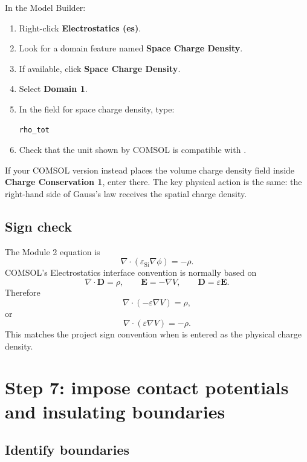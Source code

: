 \documentclass[11pt]{article}
\newcommand{\Evec}{\mathbf{E}}
\newcommand{\Dvec}{\mathbf{D}}
\newcommand{\epss}{\varepsilon_{\mathrm{Si}}}
\newcommand{\code}[1]{\texttt{\detokenize{#1}}}
\begin{document}
In the Model Builder:
\begin{enumerate}[leftmargin=2em]
\item Right-click \textbf{Electrostatics (es)}.
\item Look for a domain feature named \textbf{Space Charge Density}.
\item If available, click \textbf{Space Charge Density}.
\item Select \textbf{Domain 1}.
\item In the field for space charge density, type:
\begin{verbatim}
rho_tot
\end{verbatim}
\item Check that the unit shown by COMSOL is compatible with \code{C/m^3}.
\end{enumerate}

If your COMSOL version instead places the volume charge density field inside \textbf{Charge Conservation 1}, enter \code{rho\_tot} there. The key physical action is the same: the right-hand side of Gauss's law receives the spatial charge density.

\subsection{Sign check}

The Module 2 equation is
\begin{equation}
\nabla\cdot(\epss\nabla\phi)=-\rho.
\end{equation}
COMSOL's Electrostatics interface convention is normally based on
\begin{equation}
\nabla\cdot\Dvec=\rho,\qquad \Evec=-\nabla V,\qquad \Dvec=\varepsilon\Evec.
\end{equation}
Therefore
\begin{equation}
\nabla\cdot(-\varepsilon\nabla V)=\rho,
\end{equation}
or
\begin{equation}
\nabla\cdot(\varepsilon\nabla V)=-\rho.
\end{equation}
This matches the project sign convention when \code{rho\_tot} is entered as the physical charge density.

\section{Step 7: impose contact potentials and insulating boundaries}

\subsection{Identify boundaries}
\end{document}
